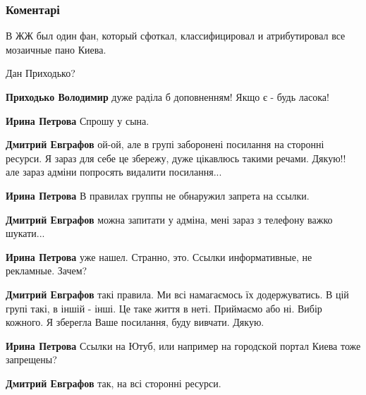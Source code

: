  
 
 
 
 
\subsubsection{Коментарі}
\label{sec:30_04_2020.fb.fb_group.story_kiev_ua.2.kievskie_mozaiki.cmt}

\begin{itemize} %
В ЖЖ был один фан, который сфоткал, классифицировал и атрибутировал все мозаичные пано Киева.

\begin{itemize} %
Дан Приходько?

\textbf{Приходько Володимир} дуже раділа б доповненням! Якщо є - будь ласока!

\textbf{Ирина Петрова} Спрошу у сына.

\textbf{Дмитрий Евграфов} ой-ой, але в групі заборонені посилання на сторонні ресурси. Я зараз для себе це збережу, дуже цікавлюсь такими речами. Дякую!! але зараз адміни попросять видалити посилання...

\textbf{Ирина Петрова} В правилах группы не обнаружил запрета на ссылки.

\textbf{Дмитрий Евграфов} можна запитати у адміна, мені зараз з телефону важко шукати...

\textbf{Ирина Петрова} уже нашел. Странно, это. Ссылки информативные, не рекламные. Зачем?

\textbf{Дмитрий Евграфов} такі правила. Ми всі намагаємось їх додержуватись. В цій групі такі, в іншій - інші. Це таке життя в неті. Приймаємо або ні. Вибір кожного. Я зберегла Ваше посилання, буду вивчати. Дякую.

\textbf{Ирина Петрова} Ссылки на Ютуб, или например на городской портал Киева тоже запрещены?

\textbf{Дмитрий Евграфов} так, на всі сторонні ресурси.
\end{itemize} %


\end{itemize}
